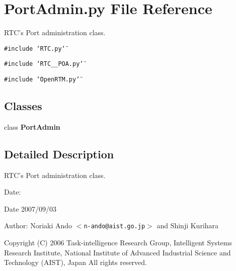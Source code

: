 \section{Port\-Admin.py File Reference}
\label{PortAdmin_8py}
RTC's Port administration class. 

{\tt \#include \char`\"{}RTC.py\char`\"{}}\par
{\tt \#include \char`\"{}RTC\_\-\_\-POA.py\char`\"{}}\par
{\tt \#include \char`\"{}Open\-RTM.py\char`\"{}}\par
\subsection*{Classes}
\begin{CompactItemize}
\item 
class {\bf Port\-Admin}
\end{CompactItemize}


\subsection{Detailed Description}
RTC's Port administration class. 

\begin{Desc}
\item[Date:]\begin{Desc}
\item[Date]2007/09/03 \end{Desc}
\end{Desc}
\begin{Desc}
\item[Author:]Noriaki Ando $<${\tt n-ando@aist.go.jp}$>$ and Shinji Kurihara\end{Desc}
Copyright (C) 2006 Task-intelligence Research Group, Intelligent Systems Research Institute, National Institute of Advanced Industrial Science and Technology (AIST), Japan All rights reserved.